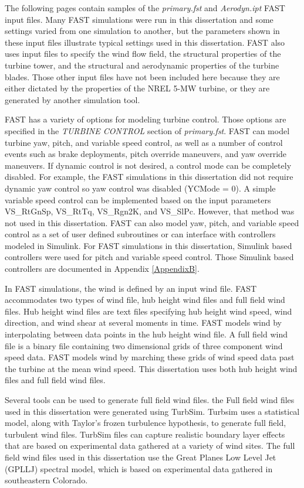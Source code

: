 The following pages contain samples of the \textit{primary.fst} and \textit{Aerodyn.ipt} FAST input files. Many FAST simulations were run in this dissertation and some settings varied from one simulation to another, but the parameters shown in these input files illustrate typical settings used in this dissertation. FAST also uses input files to specify the wind flow field, the structural properties of the turbine tower,  and the structural and aerodynamic properties of the turbine blades. Those other input files have not been included here because they are either dictated by the properties of the NREL 5-MW turbine, or they are generated by another simulation tool.

FAST has a variety of options for modeling turbine control. Those options are specified in the \textit{TURBINE CONTROL} section of \textit{primary.fst}. FAST can model turbine yaw, pitch, and variable speed control, as well as a number of control events such as brake deployments, pitch override maneuvers, and yaw override maneuvers. If dynamic control is not desired, a control mode can be completely disabled. For example, the FAST simulations in this dissertation did not require dynamic yaw control so yaw control was disabled (YCMode = 0). A simple variable speed control can be implemented based on the input parameters VS\_RtGnSp, VS\_RtTq, VS\_Rgn2K, and VS\_SlPc. However, that method was not used in this dissertation. FAST can also model yaw, pitch, and variable speed control as a set of user defined subroutines or can interface with controllers modeled in Simulink. For FAST simulations in this dissertation, Simulink based controllers were used for pitch and variable speed control. Those Simulink based controllers are documented in Appendix \ref{AppendixB}.

In FAST simulations, the wind is defined by an input wind file. FAST accommodates two types of wind file, hub height wind files and full field wind files. Hub height wind files are text files specifying hub height wind speed, wind direction, and wind shear at several moments in time. FAST models wind by interpolating between data points in the hub height wind file. A full field wind file is a binary file containing two dimensional grids of three component wind speed data. FAST models wind by marching these grids of wind speed data past the turbine at the mean wind speed. This dissertation uses both hub height wind files and full field wind files.

Several tools can be used to generate full field wind files. the Full field wind files used in this dissertation were generated using TurbSim.\cite{jonkman2012} Turbsim uses a statistical model, along with Taylor's frozen turbulence hypothesis, to generate full field, turbulent wind files. TurbSim files can capture realistic boundary layer effects that are based on experimental data gathered at a variety of wind sites. The full field wind files used in this dissertation use the Great Planes Low Level Jet (GPLLJ) spectral model, which is based on experimental data gathered in southeastern Colorado.


